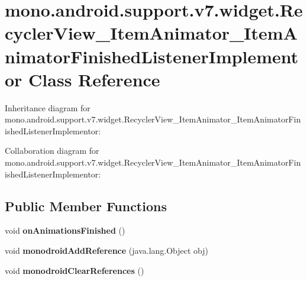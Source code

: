 \hypertarget{classmono_1_1android_1_1support_1_1v7_1_1widget_1_1_recycler_view___item_animator___item_animator_finished_listener_implementor}{}\section{mono.\+android.\+support.\+v7.\+widget.\+Recycler\+View\+\_\+\+Item\+Animator\+\_\+\+Item\+Animator\+Finished\+Listener\+Implementor Class Reference}
\label{classmono_1_1android_1_1support_1_1v7_1_1widget_1_1_recycler_view___item_animator___item_animator_finished_listener_implementor}


Inheritance diagram for mono.\+android.\+support.\+v7.\+widget.\+Recycler\+View\+\_\+\+Item\+Animator\+\_\+\+Item\+Animator\+Finished\+Listener\+Implementor\+:


Collaboration diagram for mono.\+android.\+support.\+v7.\+widget.\+Recycler\+View\+\_\+\+Item\+Animator\+\_\+\+Item\+Animator\+Finished\+Listener\+Implementor\+:
\subsection*{Public Member Functions}
\begin{DoxyCompactItemize}
\item 
\mbox{\label{classmono_1_1android_1_1support_1_1v7_1_1widget_1_1_recycler_view___item_animator___item_animator_finished_listener_implementor_af2e37040545c954c7e94e7200153ff5f}} 
void {\bfseries on\+Animations\+Finished} ()
\item 
\mbox{\label{classmono_1_1android_1_1support_1_1v7_1_1widget_1_1_recycler_view___item_animator___item_animator_finished_listener_implementor_a01b744e4c5f6525fa3bd405e255c61db}} 
void {\bfseries monodroid\+Add\+Reference} (java.\+lang.\+Object obj)
\item 
\mbox{\label{classmono_1_1android_1_1support_1_1v7_1_1widget_1_1_recycler_view___item_animator___item_animator_finished_listener_implementor_a1853ddf2c642012c0871d0d79c2b09d5}} 
void {\bfseries monodroid\+Clear\+References} ()
\end{DoxyCompactItemize}
